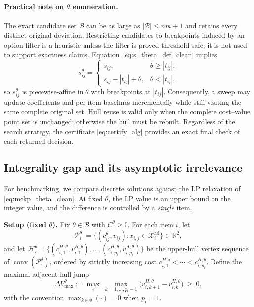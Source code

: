 \documentclass[11pt, a4paper]{article}
\theoremstyle{plain}
\theoremstyle{definition}
\theoremstyle{remark}
\begin{document}
\paragraph{Practical note on $\theta$ enumeration.}
The exact candidate set $\mathcal B$ can be as large as $|\mathcal B|\le nm+1$ and retains every distinct original deviation.  Restricting candidates to breakpoints induced by an option filter is a heuristic unless the filter is proved threshold-safe; it is not used to support exactness claims.  Equation~\eqref{eq:s_theta_def_clean} implies
\[
s^\theta_{ij}=
\begin{cases}
s_{ij}, & \theta\ge |t_{ij}|,\\
s_{ij}-|t_{ij}|+\theta, & \theta<|t_{ij}|,
\end{cases}
\]
so $s^\theta_{ij}$ is piecewise-affine in $\theta$ with breakpoints at $|t_{ij}|$. Consequently, a sweep may update coefficients and per-item baselines incrementally while still visiting the same complete original set.  Hull reuse is valid only when the complete cost--value point set is unchanged; otherwise the hull must be rebuilt.  Regardless of the search strategy, the certificate \eqref{eq:certify_alg} provides an exact final check of each returned decision.

\subsection{Integrality gap and its asymptotic irrelevance}\label{subsec:igap}

For benchmarking, we compare discrete solutions against the LP relaxation of
\eqref{eq:mckp_theta_clean}.  At fixed $\theta$, the LP value is an upper bound
on the integer value, and the difference is controlled by a \emph{single} item.

\medskip
\noindent\textbf{Setup (fixed $\theta$).}
Fix $\theta\in\mathcal B$ with $C^\theta\ge 0$. For each item $i$, let
\[
\mathcal P_i^\theta:=\{(c^\theta_{ij},v_{ij}) : x_{i,j}\in\mathcal X_i^{\mathrm{ad}}\}\subset\mathbb R^2,
\]
and let $\mathcal H_i^\theta=\{(c^{H,\theta}_{i,1},v^{H,\theta}_{i,1}),\dots,(c^{H,\theta}_{i,p_i},v^{H,\theta}_{i,p_i})\}$
be the upper-hull vertex sequence of $\operatorname{conv}(\mathcal P_i^\theta)$, ordered by strictly increasing cost
$c^{H,\theta}_{i,1}<\cdots<c^{H,\theta}_{i,p_i}$.
Define the maximal adjacent hull jump
\[
\Delta V_{\max}^\theta
:=\max_{i}\ \max_{k=1,\dots,p_i-1}\big(v^{H,\theta}_{i,k+1}-v^{H,\theta}_{i,k}\big)\ \ge\ 0,
\]
with the convention $\max_{k\in\emptyset}(\cdot)=0$ when $p_i=1$.
\end{document}
